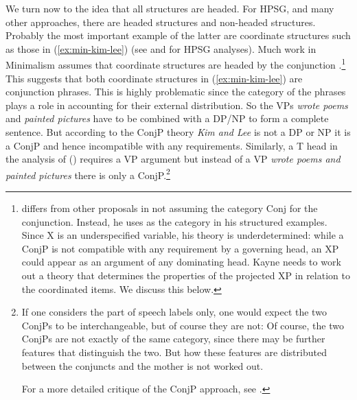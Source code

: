 \documentclass[output=paper
	        ,collection
	        ,collectionchapter
 	        ,biblatex
                ,babelshorthands
                ,newtxmath
                ,draftmode
                ,colorlinks, citecolor=brown
]{langscibook}
\begin{document}
We turn now to the idea that all structures are headed. For HPSG, and many other approaches, there
are headed structures and non-headed structures. Probably the most important example of the latter
are coordinate structures such as those in (\ref{ex:min-kim-lee}) (see \citealt{Sag2003a-u} and  for HPSG analyses).
\label{ex:min-kim-lee}
\z
Much work in Minimalism assumes that coordinate structures are headed by the conjunction
\parencites[]{Larson90a-u}[]{Radford93a-u}[Chapter~6]{Kayne94a-u}{Johannessen98a-u}[]{vanKoppen2005a-u}[]{Boskovic2009a-u}[]{Citko2011a-u}.\footnote{
  \citet[]{Kayne94a-u} differs from other proposals in not assuming the category Conj for
  the conjunction. Instead, he uses \xnull as the category in his structured examples. Since X is an
  underspecified variable, his theory is underdetermined: while a ConjP is not compatible with any
  requirement by a governing head, an XP could appear as an argument of any dominating head. Kayne
  needs to work out a theory that determines the properties of the projected XP in relation to
  the coordinated items. We discuss this below.
}
This suggests that both coordinate structures in (\ref{ex:min-kim-lee}) are conjunction phrases. This is
highly problematic since the category of the phrases plays a role in accounting for their external
distribution. So the VPs \emph{wrote poems} and \emph{painted pictures} have to be combined with a
DP/NP to form a complete sentence. But according to the ConjP theory \emph{Kim and Lee} is not a DP
or NP it is a ConjP and hence incompatible with any requirements. Similarly, a T head in the
analysis of () requires a VP argument but instead of a VP \emph{wrote poems and painted
  pictures} there is only a ConjP.\footnote{
If one considers the part of speech labels only, one would expect the two ConjPs to be interchangeable, but of course they are
not:
\label{ex:min-sang-dance}
\z
Of course, the two ConjPs are not exactly of the same category, since there may be further features that
distinguish the two. But how these features are distributed between the conjuncts and the
mother is not worked out.

For a more detailed critique of the ConjP approach, see \citet{Borsley2005a}.%
}
\end{document}

